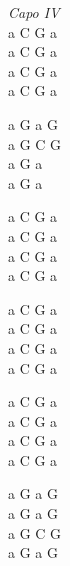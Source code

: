 \begin{chord}
    \textit{Capo IV}\\
    a C G a\\
    a C G a\\
    a C G a\\
    a C G a

    a G a G\\
    a G C G\\
    a G a\\
    a G a

    a C G a\\
    a C G a\\
    a C G a\\
    a C G a

    a C G a\\
    a C G a\\
    a C G a\\
    a C G a

    a C G a\\
    a C G a\\
    a C G a\\
    a C G a

    a G a G\\
    a G a G\\
    a G C G\\
    a G a G
\end{chord}